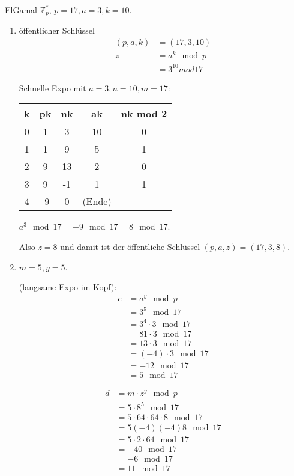 ElGamal $\mathbb{Z}_{p}^{\ast}$, $p = 17, a = 3, k = 10$.

\begin{enumerate}[label=\alph*)]
\item öffentlicher Schlüssel
\begin{align*}
( p, a, k ) &= ( 17, 3, 10 ) \\
z &= a^{k} \mod p \\
&= 3^{10} mod 17
\end{align*}

Schnelle Expo mit $a = 3, n = 10, m = 17$:

\begin{tabular}{c|c|c|c|c}
k & pk & nk & ak & nk mod 2 \\
\hline
0 & 1 & 3 & 10 & 0 \\
1 & 1 & 9 & 5 & 1 \\
2 & 9 & 13 & 2 & 0 \\
3 & 9 & -1 & 1 & 1 \\
4 & -9 & 0 & (Ende)
\end{tabular}

$a^{3} \mod 17 = -9 \mod 17 = 8 \mod 17$.

Also $z = 8$ und damit ist der öffentliche Schlüssel $( p, a, z ) = (17, 3, 8)$.
\item $m = 5, y = 5$.

(langsame Expo im Kopf):
\begin{align*}
c &= a^{y} \mod p \\
&= 3^{5} \mod 17 \\
&= 3^{4}\cdot3 \mod 17 \\
&= 81\cdot 3 \mod 17 \\
&= 13\cdot 3 \mod 17 \\
&= (-4)\cdot 3 \mod 17 \\
&= -12 \mod 17 \\
&= 5 \mod 17
\end{align*}

\begin{align*}
d &= m\cdot z^{y} \mod p \\
&= 5\cdot 8^{5} \mod 17 \\
&= 5\cdot 64 \cdot 64 \cdot 8 \mod 17 \\
&= 5(-4)(-4)8 \mod 17 \\
&= 5\cdot 2 \cdot 64 \mod 17 \\
&= -40 \mod 17 \\
&= -6 \mod 17 \\
&= 11 \mod 17
\end{align*}


\end{enumerate}
